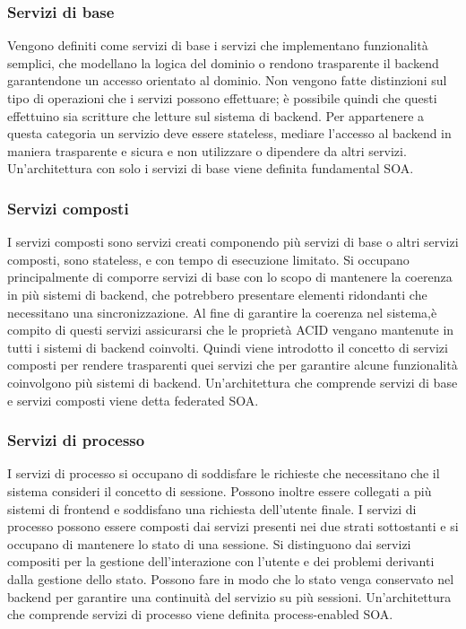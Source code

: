 \documentclass[12pt]{report}
\begin{document}
\subsubsection{Servizi di base}
Vengono definiti come servizi di base i servizi che implementano funzionalità semplici, che modellano la logica del dominio o rendono trasparente il backend garantendone un accesso orientato al dominio.
Non vengono fatte distinzioni sul tipo di operazioni che i servizi possono effettuare; è possibile quindi che questi effettuino sia scritture che letture sul sistema di backend.
Per appartenere a questa categoria un servizio deve essere stateless, mediare l'accesso al backend in maniera trasparente e sicura e non utilizzare o dipendere da altri servizi.
Un'architettura con solo i servizi di base viene definita fundamental SOA.  
\subsubsection{Servizi composti }
I servizi composti sono servizi creati componendo più servizi di base o altri servizi composti, sono stateless, e con tempo di esecuzione limitato. 
Si occupano principalmente di comporre servizi di base con lo scopo di mantenere la coerenza in più sistemi di backend, che potrebbero presentare elementi ridondanti che necessitano una sincronizzazione.
Al fine di garantire la coerenza nel sistema,è compito di questi servizi  assicurarsi che le proprietà ACID vengano mantenute in tutti i sistemi di backend coinvolti.
Quindi viene introdotto il concetto di servizi composti per rendere trasparenti quei servizi che per garantire alcune funzionalità coinvolgono più sistemi di backend.
Un'architettura che comprende servizi di base e servizi composti viene detta federated SOA.
\subsubsection{Servizi di processo}
I servizi di processo si occupano di soddisfare le richieste che necessitano che il sistema consideri il concetto di sessione.
Possono inoltre essere collegati a più sistemi di frontend e soddisfano una richiesta dell'utente finale.
I servizi di processo possono essere composti dai servizi presenti nei due strati sottostanti e si occupano di mantenere lo stato di una sessione.
Si distinguono dai servizi compositi per la gestione dell'interazione con l'utente e dei problemi derivanti dalla gestione dello stato.
Possono fare in modo che lo stato venga conservato nel backend per garantire una continuità del servizio su più sessioni. 
Un'architettura che comprende servizi di processo viene definita process-enabled SOA. 
\end{document}
